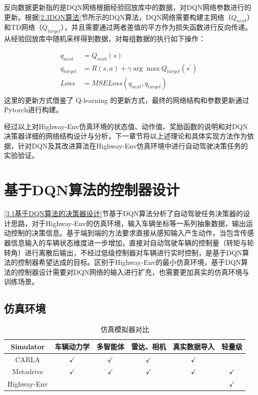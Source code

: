 反向数据更新指的是DQN网络根据经验回放库中的数据，对DQN网络参数进行的更新。根据\ref{2.3DQN算法}节所示的DQN算法，DQN网络需要构建主网络（$Q_{next}$）和TD网络（$Q_{target}$），并且需要通过两者差值的平方作为损失函数进行反向传递。从经验回放库中随机采样得到数据，对每组数据的执行如下操作：

\begin{equation}
    \begin{aligned}
        q_{next} &= Q_{next}(s)\\
        q_{target} &= R(s,a) + \gamma \arg \max Q_{target}(s^{'})\\
        Loss &= MSELoss(q_{next},q_{target})\\
    \end{aligned}
\end{equation}
这里的更新方式借鉴了 Q-learning 的更新方式，最终的网络结构和参数更新通过Pytorch进行构建。

经过以上对Highway-Env仿真环境的状态值、动作值、奖励函数的说明和对DQN决策器详细的网络结构设计与分析，下一章节将以上述理论和具体实现方法作为依据，针对DQN及其改进算法在Highway-Env仿真环境中进行自动驾驶决策任务的实验验证。

\section{基于DQN算法的控制器设计} %

\ref{3.1基于DQN算法的决策器设计}节基于DQN算法分析了自动驾驶任务决策器的设计思路，对于Highway-Env的仿真环境，输入车辆坐标等一系列抽象数据，输出运动控制的决策信息。基于端到端的方法要求直接从感知输入产生动作，当包含传感器信息输入的车辆状态维度进一步增加，直接对自动驾驶车辆的控制量（转矩与轮转角）进行离散后输出，不经过低级控制器对车辆进行实时控制，是基于DQN算法的控制器希望达成的目标。区别于Highway-Env的最小仿真环境，基于DQN算法的控制器设计需要对DQN网络的输入进行扩充，也需要更加真实的仿真环境与训练场景。

\subsection{仿真环境}

\begin{table}[htbp]
    \caption{仿真模拟器对比}\label{仿真模拟器对比}
    \centering
    \renewcommand\arraystretch{1.5}
    \begin{tabular}{cccccc}
    \toprule %
    Simulator   & 车辆动力学        & 多智能体       & 雷达、相机       & 真实数据导入       & 轻量级          \\ \hline
    CARLA\cite{Dosovitskiy17}       & $\checkmark$ & $\checkmark$ & $\checkmark$ & $\checkmark$ &              \\ 
    Metadrive\cite{li2021metadrive}   & $\checkmark$ & $\checkmark$ & $\checkmark$ & $\checkmark$ & $\checkmark$ \\ 
    Highway-Env\cite{highway-env} &              &              &              &              & $\checkmark$ \\ 
    \bottomrule %
    \end{tabular}
\end{table}

